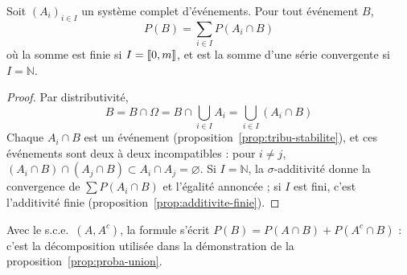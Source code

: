 \begin{theo}
\label{theo:probas-totales}
Soit $(A_i)_{i\in I}$ un système complet d'événements. Pour tout événement $B$,
\[P(B)=\sum_{i\in I}P(A_i\cap B)\]
où la somme est finie si $I=\llbracket 0,m \rrbracket$, et est la somme d'une série convergente si $I=\mathbb{N}$.
\end{theo}

\begin{proof}
Par distributivité,
\[B=B\cap\Omega=B\cap\bigcup_{i\in I}A_i=\bigcup_{i\in I}(A_i\cap B)\]
Chaque $A_i\cap B$ est un événement (proposition~\ref{prop:tribu-stabilite}), et ces événements sont deux à deux incompatibles : pour $i\neq j$, $(A_i\cap B)\cap(A_j\cap B)\subset A_i\cap A_j=\varnothing$. Si $I=\mathbb{N}$, la $\sigma$-additivité donne la convergence de $\sum P(A_i\cap B)$ et l'égalité annoncée ; si $I$ est fini, c'est l'additivité finie (proposition~\ref{prop:additivite-finie}).
\end{proof}

\begin{remarque}
Avec le s.c.e.\ $(A,A^c)$, la formule s'écrit $P(B)=P(A\cap B)+P(A^c\cap B)$ : c'est la décomposition utilisée dans la démonstration de la proposition~\ref{prop:proba-union}.
\end{remarque}
